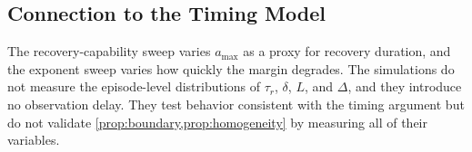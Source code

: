 \subsection{Connection to the Timing Model}

The recovery-capability sweep varies $a_{\max}$ as a proxy for recovery
duration, and the exponent sweep varies how quickly the margin degrades.  The
simulations do not measure the episode-level distributions of $\tau_r$,
$\delta$, $L$, and $\Delta$, and they introduce no observation delay.  They test
behavior consistent with the timing argument but do not validate
\cref{prop:boundary,prop:homogeneity} by measuring all of their variables.

